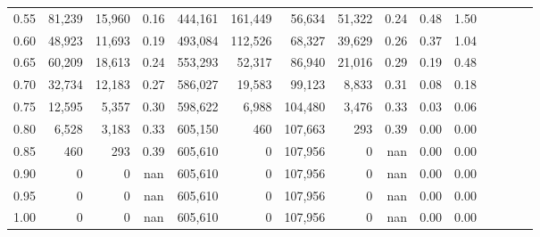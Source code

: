 \begin{tabular}{rrrcrrrrrrrrrrr}
0.55 &  81,239 &  15,960 &                                       0.16 &  444,161 &  161,449 &   56,634 &   51,322 &  0.24 &  0.48 &                         1.50 \\
0.60 &  48,923 &  11,693 &                                       0.19 &  493,084 &  112,526 &   68,327 &   39,629 &  0.26 &  0.37 &                         1.04 \\
0.65 &  60,209 &  18,613 &                                       0.24 &  553,293 &   52,317 &   86,940 &   21,016 &  0.29 &  0.19 &                         0.48 \\
0.70 &  32,734 &  12,183 &                                       0.27 &  586,027 &   19,583 &   99,123 &    8,833 &  0.31 &  0.08 &                         0.18 \\
0.75 &  12,595 &   5,357 &                                       0.30 &  598,622 &    6,988 &  104,480 &    3,476 &  0.33 &  0.03 &                         0.06 \\
0.80 &   6,528 &   3,183 &                                       0.33 &  605,150 &      460 &  107,663 &      293 &  0.39 &  0.00 &                         0.00 \\
0.85 &     460 &     293 &                                       0.39 &  605,610 &        0 &  107,956 &        0 &   nan &  0.00 &                         0.00 \\
0.90 &       0 &       0 &                                        nan &  605,610 &        0 &  107,956 &        0 &   nan &  0.00 &                         0.00 \\
0.95 &       0 &       0 &                                        nan &  605,610 &        0 &  107,956 &        0 &   nan &  0.00 &                         0.00 \\
1.00 &       0 &       0 &                                        nan &  605,610 &        0 &  107,956 &        0 &   nan &  0.00 &                         0.00 \\
\bottomrule
\end{tabular}
